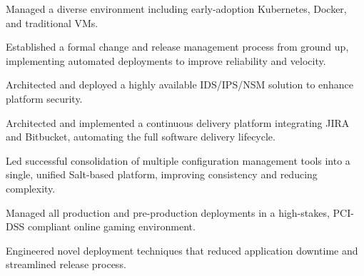 \documentclass[11pt,a4paper,sans]{moderncv}
\begin{document}
{{{{{{{{{{{{  \item{ Managed a diverse environment including early-adoption Kubernetes, Docker, and traditional VMs. }
  



  
  \item{ Established a formal change and release management process from ground up, implementing automated deployments to improve reliability and velocity. }
  
  \item{ Architected and deployed a highly available IDS/IPS/NSM solution to enhance platform security. }
  



  
  \item{ Architected and implemented a continuous delivery platform integrating JIRA and Bitbucket, automating the full software delivery lifecycle. }
  
  \item{ Led successful consolidation of multiple configuration management tools into a single, unified Salt-based platform, improving consistency and reducing complexity. }
  



  
  \item{ Managed all production and pre-production deployments in a high-stakes, PCI-DSS compliant online gaming environment. }
  
  \item{ Engineered novel deployment techniques that reduced application downtime and streamlined release process. }
  









}}}}}}}}}}}}
\end{document}
